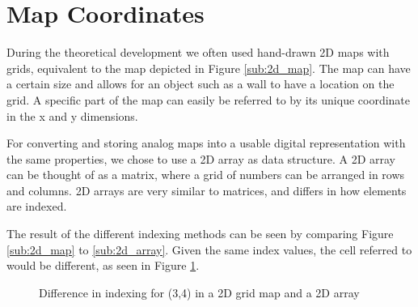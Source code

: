 \section{Map Coordinates}
\label{sec:map_coordinates} %
During the theoretical development we often used hand-drawn 2D maps with grids, equivalent to the map depicted in Figure \ref{sub:2d_map}. 
The map can have a certain size and allows for an object such as a wall to have a location on the grid. 
A specific part of the map can easily be referred to by its unique coordinate in the x and y dimensions. 

For converting and storing analog maps into a usable digital representation with the same properties, 
we chose to use a 2D array as data structure. 
A 2D array can be thought of as a matrix, where a grid of numbers can be arranged in rows and columns. 
2D arrays are very similar to matrices, and differs in how elements are indexed.

The result of the different indexing methods can be seen by comparing Figure \ref{sub:2d_map} to \ref{sub:2d_array}. 
Given the same index values, the cell referred to would be different, 
as seen in Figure \ref{fig:grid_map_vs_array}.


\begin{figure}[htp]
    \centering
    \hspace{0.05\textwidth}  
    \caption{Difference in indexing for (3,4) in a 2D grid map and a 2D array}
    \label{fig:grid_map_vs_array}
\end{figure}

